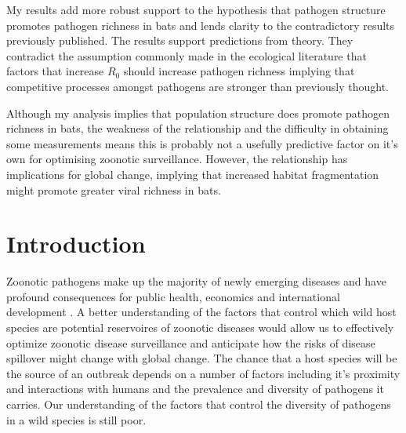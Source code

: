 My results add more robust support to the hypothesis that pathogen structure promotes pathogen richness in bats and lends clarity to the contradictory results previously published.
The results support predictions from theory.
They contradict the assumption commonly made in the ecological literature that factors that increase $R_0$ should increase pathogen richness implying that competitive processes amongst pathogens are stronger than previously thought.



Although my analysis implies that population structure does promote pathogen richness in bats, the weakness of the relationship and the difficulty in obtaining some measurements means this is probably not a usefully predictive factor on it's own for optimising zoonotic surveillance.
However, the relationship has implications for global change, implying that increased habitat fragmentation might promote greater viral richness in bats.






\section{Introduction}



Zoonotic pathogens make up the majority of newly emerging diseases and have profound consequences for public health, economics and international development \cite{jones2008global, smith2014global, ebolaWorldbank}.
A better understanding of the factors that control which wild host species are potential reservoires of zoonotic diseases would allow us to effectively optimize zoonotic disease surveillance and anticipate how the risks of disease spillover might change with global change.
The chance that a host species will be the source of an outbreak depends on a number of factors including it's proximity and interactions with humans and the prevalence and diversity of pathogens it carries.
Our understanding of the factors that control the diversity of pathogens in a wild species is still poor.


